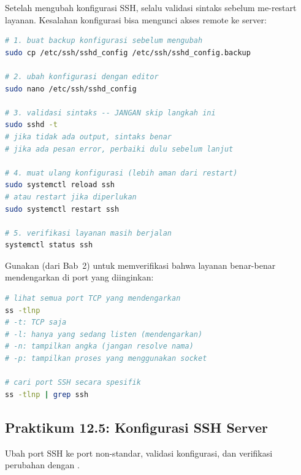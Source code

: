 Setelah mengubah konfigurasi SSH, selalu validasi sintaks sebelum me-restart layanan. Kesalahan konfigurasi bisa mengunci akses remote ke server:

\begin{lstlisting}[language=bash, caption={Alur aman mengubah konfigurasi SSH}]
# 1. buat backup konfigurasi sebelum mengubah
sudo cp /etc/ssh/sshd_config /etc/ssh/sshd_config.backup

# 2. ubah konfigurasi dengan editor
sudo nano /etc/ssh/sshd_config

# 3. validasi sintaks -- JANGAN skip langkah ini
sudo sshd -t
# jika tidak ada output, sintaks benar
# jika ada pesan error, perbaiki dulu sebelum lanjut

# 4. muat ulang konfigurasi (lebih aman dari restart)
sudo systemctl reload ssh
# atau restart jika diperlukan
sudo systemctl restart ssh

# 5. verifikasi layanan masih berjalan
systemctl status ssh
\end{lstlisting}

Gunakan  (dari Bab~2) untuk memverifikasi bahwa layanan benar-benar mendengarkan di port yang diinginkan:

\begin{lstlisting}[language=bash, caption={Verifikasi port dengan ss}]
# lihat semua port TCP yang mendengarkan
ss -tlnp
# -t: TCP saja
# -l: hanya yang sedang listen (mendengarkan)
# -n: tampilkan angka (jangan resolve nama)
# -p: tampilkan proses yang menggunakan socket

# cari port SSH secara spesifik
ss -tlnp | grep ssh
\end{lstlisting}

\subsection*{Praktikum 12.5: Konfigurasi SSH Server}

Ubah port SSH ke port non-standar, validasi konfigurasi, dan verifikasi perubahan dengan .

